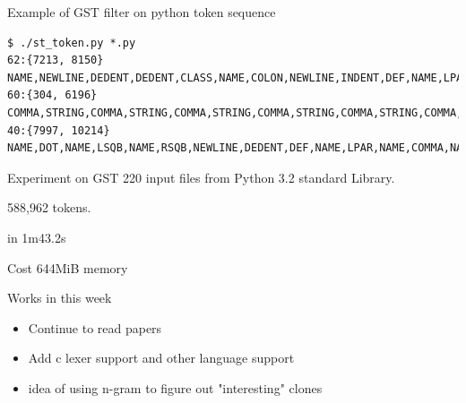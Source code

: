 \begin{frame}[fragile,shrink=10]{Example of GST filter on python token sequence}
\lstset{breaklines=true}
\begin{lstlisting}
$ ./st_token.py *.py
62:{7213, 8150}	NAME,NEWLINE,DEDENT,DEDENT,CLASS,NAME,COLON,NEWLINE,INDENT,DEF,NAME,LPAR,NAME,COMMA,NAME,COMMA,NAME,COMMA,NAME,COMMA,NAME,RPAR,COLON,NEWLINE,INDENT,NAME,DOT,NAME,EQUAL,NAME,NEWLINE,NAME,DOT,NAME,EQUAL,NAME,NEWLINE,NAME,DOT,NAME,EQUAL,NAME,NEWLINE,NAME,DOT,NAME,EQUAL,NAME,NEWLINE,DEDENT,DEF,NAME,LPAR,NAME,RPAR,COLON,NEWLINE,INDENT,RETURN,NAME,DOT,NAME
60:{304, 6196}	COMMA,STRING,COMMA,STRING,COMMA,STRING,COMMA,STRING,COMMA,STRING,COMMA,STRING,COMMA,STRING,COMMA,STRING,COMMA,STRING,COMMA,STRING,COMMA,STRING,COMMA,STRING,COMMA,STRING,COMMA,STRING,COMMA,STRING,COMMA,STRING,COMMA,STRING,COMMA,STRING,COMMA,STRING,COMMA,STRING,COMMA,STRING,COMMA,STRING,COMMA,STRING,COMMA,STRING,COMMA,STRING,COMMA,STRING,COMMA,STRING,COMMA,STRING,COMMA,STRING,COMMA,STRING
40:{7997, 10214}	NAME,DOT,NAME,LSQB,NAME,RSQB,NEWLINE,DEDENT,DEF,NAME,LPAR,NAME,COMMA,NAME,COMMA,NAME,RPAR,COLON,NEWLINE,INDENT,NAME,DOT,NAME,LSQB,NAME,RSQB,EQUAL,NAME,NEWLINE,DEDENT,DEF,NAME,LPAR,NAME,COMMA,NAME,RPAR,COLON,NEWLINE,INDENT
\end{lstlisting}
\end{frame}

\begin{frame}{Experiment on GST} 
\alert{220} input files from Python 3.2 standard Library.

\alert{588,962} tokens.

in \alert{1m43.2s}

Cost \alert{644MiB} memory 

\end{frame}

\begin{frame}{Works in this week}
\begin{itemize}
\item Continue to read papers
\item Add c lexer support and other language support
\item idea of using n-gram to figure out "interesting" clones
\end{itemize}
\end{frame}


